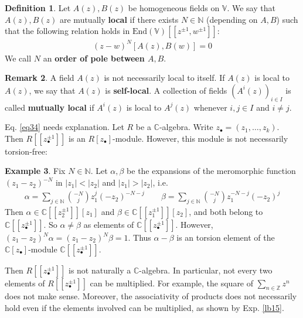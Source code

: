 \documentclass[12pt,b5paper,notitlepage]{article}
\theoremstyle{definition}
\newtheorem{df}{Definition}[section]
\newtheorem{eg}[df]{Example}
\newtheorem{rem}[df]{Remark}
\theoremstyle{plain}
\newcommand{\End}{\mathrm{End}} %
\newcommand{\blt}{\bullet}
\newcommand{\Vbb}{\mathbb V}
\newcommand{\Cbb}{\mathbb C}
\newcommand{\Nbb}{\mathbb N}
\newcommand{\Zbb}{\mathbb Z}
\numberwithin{equation}{section}
\begin{document}
\begin{df}
Let $A(z),B(z)$ be homogeneous fields on $\Vbb$. We say that $A(z),B(z)$ are mutually \textbf{local}  if there exists $N\in\Nbb$ (depending on $A,B$) such that the following relation holds in $\End(\Vbb)[[z^{\pm1},w^{\pm1}]]$: 
\begin{align}\label{eq34}
(z-w)^N[A(z),B(w)]=0
\end{align}
We call $N$ an \textbf{order of pole between $A,B$}.
\end{df}


\begin{rem}
A field $A(z)$ is not necessarily local to itself. If $A(z)$ is local to $A(z)$, we say that $A(z)$ is \textbf{self-local}. A collection of fields $(A^i(z))_{i\in I}$ is called \textbf{mutually local}  if $A^i(z)$ is local to $A^j(z)$ whenever $i,j\in I$ and $i\neq j$.
\end{rem}


Eq. \eqref{eq34} needs explanation. Let $R$ be a $\Cbb$-algebra. Write $z_\blt=(z_1,\dots,z_k)$. Then $R[[z_\blt^{\pm1}]]$ is an $R[z_\blt]$-module. However, this module is not necessarily torsion-free:

\begin{eg}\label{lb14}
Fix $N\in\Nbb$. Let $\alpha,\beta$ be the expansions of the meromorphic function $(z_1-z_2)^{-N}$ in $|z_1|<|z_2|$ and $|z_1|>|z_2|$, i.e.
\begin{align*}
\alpha=\sum_{j\in\Nbb} {-N\choose j}z_1^j(-z_2)^{-N-j}\qquad \beta=\sum_{j\in\Nbb}{-N\choose j}z_1^{-N-j}(-z_2)^j
\end{align*}
Then $\alpha\in \Cbb[[z_2^{\pm1}]][z_1]$ and $\beta\in\Cbb[[z_1^{\pm 1}]][z_2]$, and both belong to $\Cbb[[z_\blt^{\pm1}]]$. So $\alpha\neq \beta$ as elements of $\Cbb[[z_\blt^{\pm1}]]$. However, $(z_1-z_2)^N\alpha=(z_1-z_2)^N\beta=1$. Thus $\alpha-\beta$ is an torsion element of the $\Cbb[z_\blt]$-module $\Cbb[[z_\blt^{\pm1}]]$.
\end{eg}





Then $R[[z_\blt^{\pm1}]]$ is not naturally a $\Cbb$-algebra. In particular, not every two elements of $R[[z_\blt^{\pm1}]]$ can be multiplied. For example, the square of $\sum_{n\in\Zbb}z^n$ does not make sense. Moreover, the associativity of products does not necessarily hold even if the elements involved can be multiplied, as shown by Exp. \ref{lb15}. %
\end{document}
